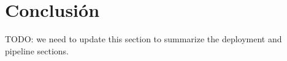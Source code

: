 \section{Conclusión}

TODO: we need to update this section to summarize the deployment and pipeline sections.